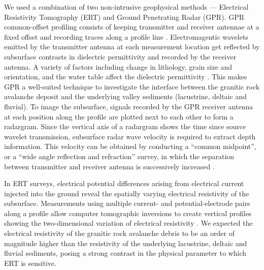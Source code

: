 \documentclass[utf8]{frontiersSCNS}
\begin{document}
We used a combination of two non-intrusive geophysical methods --- Electrical Resistivity Tomography (ERT) and Ground Penetrating Radar (GPR). GPR common-offset profiling consists of keeping transmitter and receiver antennae at a fixed offset and recording traces along a profile line \citep{jol2008ground}. Electromagentic wavelets emitted by the transmitter antenna at each measurement location get reflected by subsurface contrasts in dielectric permittivity \citep{neal2004ground} and recorded by the receiver antenna. A variety of factors including change in lithology, grain size and orientation, and the water table affect the dielectric permittivity \citep{Olhoeft1998,neal2004ground}. This makes GPR a well-suited technique to investigate the interface between the granitic rock avalanche deposit and the underlying valley sediments (lacustrine, deltaic and fluvial). To image the subsurface, signals recorded by the GPR receiver antenna at each position along the profile are plotted next to each other to form a radargram. Since the vertical axis of a radargram shows the time since source wavelet transmission, subsurface radar wave velocity is required to extract depth information. This velocity can be obtained by conducting a ``common midpoint'', or a ``wide angle reflection and refraction'' survey, in which the separation between transmitter and receiver antenna is successively increased \citep{annan1976impulse, davis1989ground}.


In ERT surveys, electrical potential differences arising from electrical current injected into the ground reveal the spatially varying electrical resistivity of the subsurface. Measurements using multiple current- and potential-electrode pairs along a profile allow computer tomographic inversions to create vertical profiles showing the two-dimensional variation of electrical resistivity \citep{oldenburg1999estimating, loke2013recent}. We expected the electrical resistivity of the granitic rock avalanche debris to be an order of magnitude higher than the resistivity of the underlying lacustrine, deltaic and fluvial sediments, posing a strong contrast in the physical parameter to which ERT is sensitive.
\end{document}
